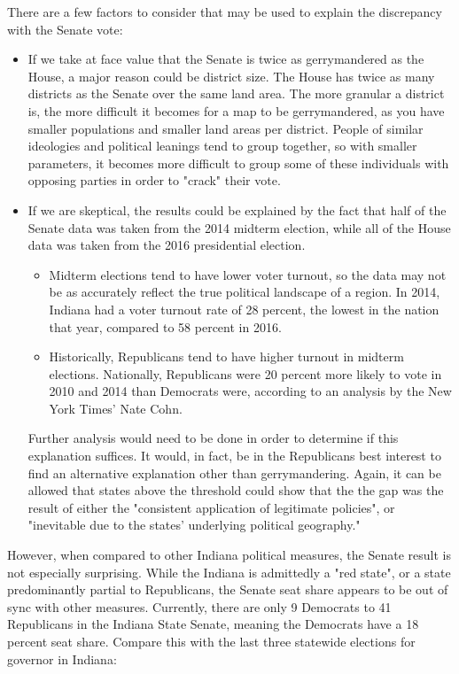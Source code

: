 \documentclass[sigconf]{acmart}
\begin{document}
There are a few factors to consider that may be used to explain the discrepancy with the Senate vote:
\begin{itemize}
    \item If we take at face value that the Senate is twice as gerrymandered as the House, a major reason could be district size. The House has twice as many districts as the Senate over the same land area. The more granular a district is, the more difficult it becomes for a map to be gerrymandered, as you have smaller populations and smaller land areas per district. People of similar ideologies and political leanings tend to group together, so with smaller parameters, it becomes more difficult to group some of these individuals with opposing parties in order to "crack" their vote. 
    \item If we are skeptical, the results could be explained by the fact that half of the Senate data was taken from the 2014 midterm election, while all of the House data was taken from the 2016 presidential election. 
    \begin{itemize}
        \item Midterm elections tend to have lower voter turnout, so the data may not be as accurately reflect the true political landscape of a region. In 2014, Indiana had a voter turnout rate of 28 percent, the lowest in the nation that year\cite{2014turnout}, compared to 58 percent in 2016.\cite{2016turnout}
        \item Historically, Republicans tend to have higher turnout in midterm elections. Nationally, Republicans were 20 percent more likely to vote in 2010 and 2014 than Democrats were, according to an analysis by the New York Times' Nate Cohn. \cite{cohn}
    \end{itemize}
    Further analysis would need to be done in order to determine if this explanation suffices. It would, in fact, be in the Republicans best interest to find an alternative explanation other than gerrymandering. Again, it can be allowed that states above the threshold could show that the the gap was the result of either the "consistent application of legitimate policies", or "inevitable due to the states' underlying political geography."\cite{chicagothreshold}
\end{itemize}

However, when compared to other Indiana political measures, the Senate result is not especially surprising. While the Indiana is admittedly a "red state", or a state predominantly partial to Republicans, the Senate seat share appears to be out of sync with other measures. Currently, there are only 9 Democrats to 41 Republicans in the Indiana State Senate\cite{senateresults2014}\cite{senateresults2016}, meaning the Democrats have a 18 percent seat share. Compare this with the last three statewide elections for governor in Indiana:
\end{document}
